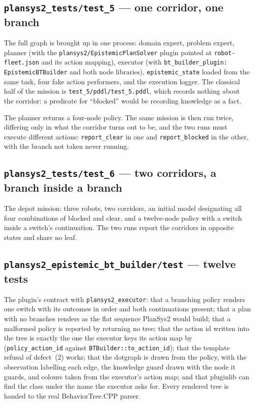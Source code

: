 \documentclass[11pt,a4paper]{article}
\newcommand{\code}[1]{\texttt{\small #1}}
\begin{document}
\subsection*{\code{plansys2\_tests/test\_5} --- one corridor, one branch}

The full graph is brought up in one process: domain expert, problem expert,
planner (with the \code{plansys2/EpistemicPlanSolver} plugin pointed at
\code{robot-fleet.json} and its action mapping), executor (with
\code{bt\_builder\_plugin: EpistemicBTBuilder} and both node libraries),
\code{epistemic\_state} loaded from the same task, four fake action performers,
and the execution logger. The classical half of the mission is
\code{test\_5/pddl/test\_5.pddl}, which records nothing about the corridor: a
predicate for ``blocked'' would be recording knowledge as a fact.

The planner returns a four-node policy. The same mission is then run twice,
differing only in what the corridor turns out to be, and the two runs must
execute different actions: \code{report\_clear} in one and
\code{report\_blocked} in the other, with the branch not taken never running.

\subsection*{\code{plansys2\_tests/test\_6} --- two corridors, a branch inside a branch}

The depot mission: three robots, two corridors, an initial model designating
all four combinations of blocked and clear, and a twelve-node policy with a
switch inside a switch's continuation. The two runs report the corridors in
opposite states and share no leaf.

\subsection*{\code{plansys2\_epistemic\_bt\_builder/test} --- twelve tests}

The plugin's contract with \code{plansys2\_executor}: that a branching policy
renders one switch with its outcomes in order and both continuations present;
that a plan with no branches renders as the flat sequence PlanSys2 would build;
that a malformed policy is reported by returning no tree; that the action id
written into the tree is exactly the one the executor keys its action map by
(\code{policy\_action\_id} against \code{BTBuilder::to\_action\_id}); that the
template refusal of defect~(2) works; that the dotgraph is drawn from the
policy, with the observation labelling each edge, the knowledge guard drawn
with the node it guards, and colours taken from the executor's action map; and
that pluginlib can find the class under the name the executor asks for. Every
rendered tree is handed to the real BehaviorTree.CPP parser.
\end{document}
